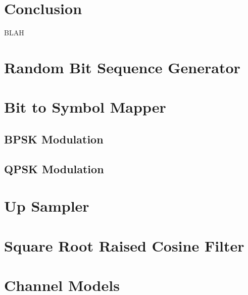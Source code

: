 \documentclass[]{article}
\begin{document}
\newpage
\section{Conclusion}
\label{sec:conc}

BLAH

\appendix
\newpage


\newpage
%

\section{Random Bit Sequence Generator}
\label{app:random_bit_generator}


\section{Bit to Symbol Mapper}
\label{app:bittosym}
\subsection{BPSK Modulation}
\label{app:bpsk_mod}


\subsection{QPSK Modulation}
\label{app:qpsk_mod}


\section{Up Sampler}
\label{app:impulse_train}


\section{Square Root Raised Cosine Filter}
\label{app:sqrt_raised_cosine}


\section{Channel Models}
\end{document}
